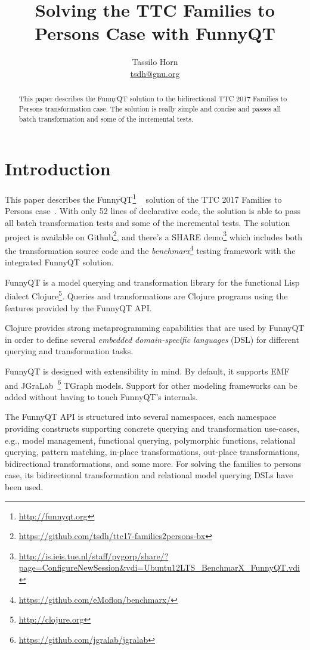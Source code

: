 \documentclass[a4paper]{article}
\title{Solving the TTC Families to Persons Case with FunnyQT}
\author{Tassilo Horn\\ \href{mailto:tsdh@gnu.org}{tsdh@gnu.org}}
\begin{document}
\maketitle

\begin{abstract}
  This paper describes the FunnyQT solution to the bidirectional TTC 2017
  Families to Persons transformation case.  The solution is really simple and
  concise and passes all batch transformation and some of the incremental
  tests.
\end{abstract}


\section{Introduction}
\label{sec:introduction}

This paper describes the FunnyQT\footnote{\url{http://funnyqt.org}}
~\cite{diss,funnyqt-icgt15} solution of the TTC 2017 Families to Persons
case~\cite{f2p-case-desc}.  With only 52 lines of declarative code, the
solution is able to pass all batch transformation tests and some of the
incremental tests.  The solution project is available on
Github\footnote{\url{https://github.com/tsdh/ttc17-families2persons-bx}}, and
there's a SHARE
demo\footnote{\url{http://is.ieis.tue.nl/staff/pvgorp/share/?page=ConfigureNewSession&vdi=Ubuntu12LTS_BenchmarX_FunnyQT.vdi}}
which includes both the transformation source code and the
\emph{benchmarx}\footnote{\url{https://github.com/eMoflon/benchmarx/}} testing
framework with the integrated FunnyQT solution.


FunnyQT is a model querying and transformation library for the functional Lisp
dialect Clojure\footnote{\url{http://clojure.org}}.  Queries and
transformations are Clojure programs using the features provided by the FunnyQT
API.

Clojure provides strong metaprogramming capabilities that are used by FunnyQT
in order to define several \emph{embedded domain-specific languages} (DSL) for
different querying and transformation tasks.

FunnyQT is designed with extensibility in mind.  By default, it supports
EMF~\cite{Steinberg2008EEM} and
JGraLab~\footnote{\url{https://github.com/jgralab/jgralab}} TGraph models.
Support for other modeling frameworks can be added without having to touch
FunnyQT's internals.

The FunnyQT API is structured into several namespaces, each namespace providing
constructs supporting concrete querying and transformation use-cases, e.g.,
model management, functional querying, polymorphic functions, relational
querying, pattern matching, in-place transformations, out-place
transformations, bidirectional transformations, and some more.  For solving the
families to persons case, its bidirectional transformation and relational model
querying DSLs have been used.
\end{document}
